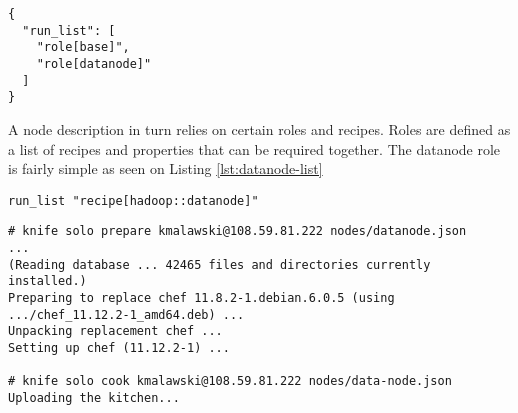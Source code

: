 \begin{lstlisting}[caption={Example data-node.json file}]
{
  "run_list": [
    "role[base]",
    "role[datanode]"
  ]
}
\end{lstlisting}

A node description in turn relies on certain roles and recipes. Roles are defined as a list of recipes and properties that can be required together. The datanode role is fairly simple as seen on Listing \ref{lst:datanode-list}

\begin{lstlisting}[caption={Example roles/datanode.rb file}]
run_list "recipe[hadoop::datanode]"
\end{lstlisting}



\begin{lstlisting}[caption={Preparing and Cooking a server with in order to prepare it for becoming a Hadoop data-node},label={lst:cheffing-data-node}]
# knife solo prepare kmalawski@108.59.81.222 nodes/datanode.json
...
(Reading database ... 42465 files and directories currently installed.)
Preparing to replace chef 11.8.2-1.debian.6.0.5 (using .../chef_11.12.2-1_amd64.deb) ...
Unpacking replacement chef ...
Setting up chef (11.12.2-1) ...

# knife solo cook kmalawski@108.59.81.222 nodes/data-node.json
Uploading the kitchen...

\end{lstlisting}














